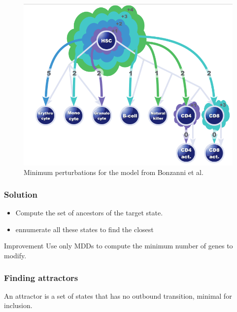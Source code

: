 \documentclass{beamer}
\begin{document}
\begin{frame}
  \begin{figure}
    \includegraphics[scale=0.35]{img/push}
    \caption{Minimum perturbations for the model from Bonzanni et al.}
  \end{figure}
\end{frame}

\begin{frame}
  \frametitle{Solution}
  \begin{itemize}
  \item Compute the set of ancestors of the target state.
    \bigskip
    
  \item ennumerate all these states to find the closest
  \end{itemize}
  \bigskip
  
  \begin{block}{Improvement}
    Use only MDDs to compute the minimum number of genes to modify.
  \end{block}
\end{frame}


\begin{frame}
  \frametitle{Finding attractors}
  \begin{definition}
    An attractor is a set of states that has no outbound transition, minimal for inclusion.
  \end{definition}
\end{frame}
\end{document}
